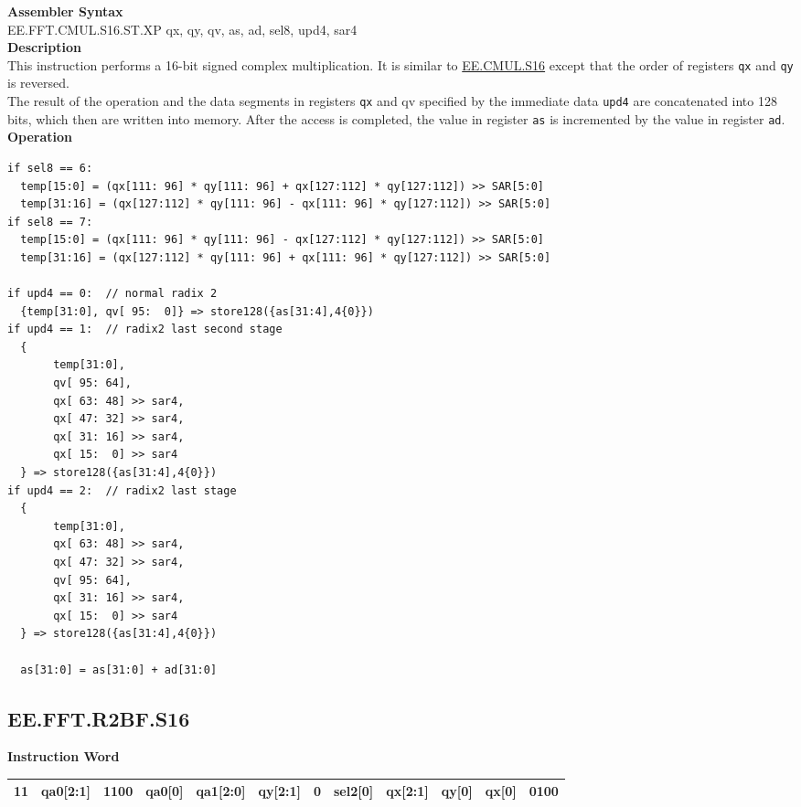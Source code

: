 \textbf{Assembler Syntax} \\
EE.FFT.CMUL.S16.ST.XP qx, qy, qv, as, ad, sel8, upd4, sar4 \\
\textbf{Description} \\
This instruction performs a 16-bit signed complex multiplication. It is similar to \hyperref[instruction:EECMULS16]{EE.CMUL.S16} except that the order of registers \lstinline{qx} and \lstinline{qy} is reversed.\\
The result of the operation and the data segments in registers \lstinline{qx} and qv specified by the immediate data \lstinline{upd4} are concatenated into 128 bits, which then are written into memory. After the access is completed, the value in register \lstinline{as} is incremented by the value in register \lstinline{ad}.
\textbf{Operation}
\begin{lstlisting}
if sel8 == 6:
  temp[15:0] = (qx[111: 96] * qy[111: 96] + qx[127:112] * qy[127:112]) >> SAR[5:0]
  temp[31:16] = (qx[127:112] * qy[111: 96] - qx[111: 96] * qy[127:112]) >> SAR[5:0]
if sel8 == 7:
  temp[15:0] = (qx[111: 96] * qy[111: 96] - qx[127:112] * qy[127:112]) >> SAR[5:0]
  temp[31:16] = (qx[127:112] * qy[111: 96] + qx[111: 96] * qy[127:112]) >> SAR[5:0]

if upd4 == 0:  // normal radix 2
  {temp[31:0], qv[ 95:  0]} => store128({as[31:4],4{0}})
if upd4 == 1:  // radix2 last second stage
  {
       temp[31:0],
       qv[ 95: 64],
       qx[ 63: 48] >> sar4,
       qx[ 47: 32] >> sar4,
       qx[ 31: 16] >> sar4,
       qx[ 15:  0] >> sar4
  } => store128({as[31:4],4{0}})
if upd4 == 2:  // radix2 last stage
  {
       temp[31:0],
       qx[ 63: 48] >> sar4,
       qx[ 47: 32] >> sar4,
       qv[ 95: 64],
       qx[ 31: 16] >> sar4,
       qx[ 15:  0] >> sar4
  } => store128({as[31:4],4{0}})

  as[31:0] = as[31:0] + ad[31:0]
\end{lstlisting}



\clearpage
\subsection{EE.FFT.R2BF.S16}\label{instruction:EEFFTR2BFS16}
\setlength\tabcolsep{6pt}
\textbf{Instruction Word} \\
\begin{tabular}{|c|c|c|c|c|c|c|c|c|c|c|c|}
	\hline
	11 & qa0[2:1] & 1100 & qa0[0] & qa1[2:0] & qy[2:1] & 0 & sel2[0] & qx[2:1] & qy[0] & qx[0] & 0100 \\
	\hline
\end{tabular}

